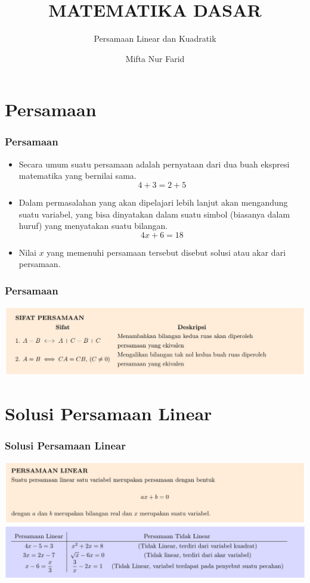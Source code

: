\documentclass[pdflatex,compress,mathserif]{beamer}
\title{MATEMATIKA DASAR}
\subtitle{Persamaan Linear dan Kuadratik}
\author{Mifta Nur Farid}
\begin{document}
\maketitle

\section{Persamaan}

\begin{frame}
\frametitle{Persamaan}
	\begin{itemize}
		\item Secara umum suatu persamaan adalah pernyataan dari dua buah ekspresi matematika yang bernilai sama.
		$$ 4 + 3 = 2 + 5 $$
		\item Dalam permasalahan yang akan dipelajari lebih lanjut akan mengandung suatu variabel, yang bisa dinyatakan dalam suatu simbol (biasanya dalam huruf) yang menyatakan suatu bilangan.
		$$ 4x+6 = 18 $$
		\item Nilai $x$ yang memenuhi persamaan tersebut disebut solusi atau akar dari persamaan.
	\end{itemize}
\end{frame}

\begin{frame}
	\frametitle{Persamaan}
	\begin{center}
		\includegraphics[width=\linewidth]{img/img01}
	\end{center}
\end{frame}

\section{Solusi Persamaan Linear}

\begin{frame}
	\frametitle{Solusi Persamaan Linear}
	\begin{center}
		\includegraphics[width=\linewidth]{img/img02}
		\includegraphics[width=\linewidth]{img/img03}
	\end{center}
\end{frame}
\end{document}
